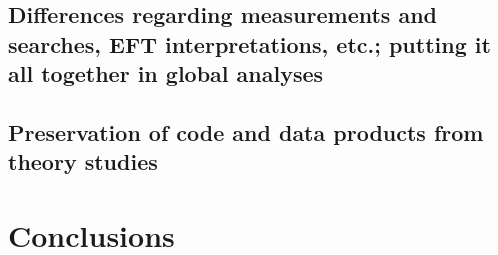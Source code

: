 \documentclass[11pt]{article}
\begin{document}
\subsection{Differences regarding measurements and searches, EFT interpretations, etc.; putting it all together in global analyses}

\subsection{Preservation of code and data products from theory studies}


\section{Conclusions}



\def\thefootnote{\fnsymbol{footnote}}
\setcounter{footnote}{0}
%




\end{document}
